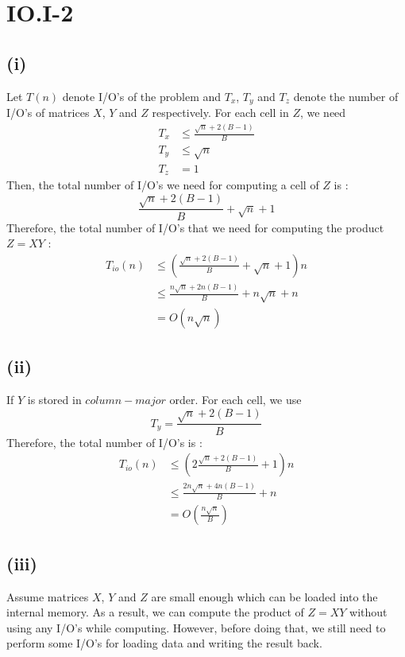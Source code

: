 \section*{IO.I-2}
\subsection*{(i)}
Let $T(n)$ denote I/O's of the problem and $T_x$, $T_y$ and $T_z$ denote the number of I/O's of matrices $X$, $Y$ and $Z$ respectively.
For each cell in $Z$, we need
\begin{align*}
	T_x &\leq \frac{\sqrt{n}+2(B-1)}{B}\\
	T_y &\leq \sqrt{n} \\
	T_z &= 1
\end{align*}
Then, the total number of I/O's we need for computing a cell of $Z$ is :
$$\frac{\sqrt{n}+2(B-1)}{B} + \sqrt{n} + 1$$
Therefore, the total number of I/O's that we need for computing the product $Z=XY$ :
\begin{align*}
    T_{io}(n) &\leq ( \frac{\sqrt{n}+2(B-1)}{B} + \sqrt{n} + 1	)n\\
	&\leq \frac{n\sqrt{n}+2n(B-1)}{B} + n\sqrt{n} + n \\
	&= O(n\sqrt{n})
\end{align*}

\subsection*{(ii)}
If $Y$ is stored in $column-major$ order. For each cell, we use $$T_y=\frac{\sqrt{n}+2(B-1)}{B}$$
Therefore, the total number of I/O's is :
\begin{align*}
    T_{io}(n) &\leq ( 2\frac{\sqrt{n}+2(B-1)}{B} + 1	)n\\
	&\leq \frac{2n\sqrt{n}+4n(B-1)}{B} + n \\
	&= O(\frac{n\sqrt{n}}{B})
\end{align*}

\subsection*{(iii)}

Assume matrices $X$, $Y$ and $Z$ are small enough which can be loaded into the internal memory. As a result, we can compute the product of $Z=XY$
without using any I/O's while computing. However, before doing that, we still need to perform some I/O's for loading data and writing the result back.

